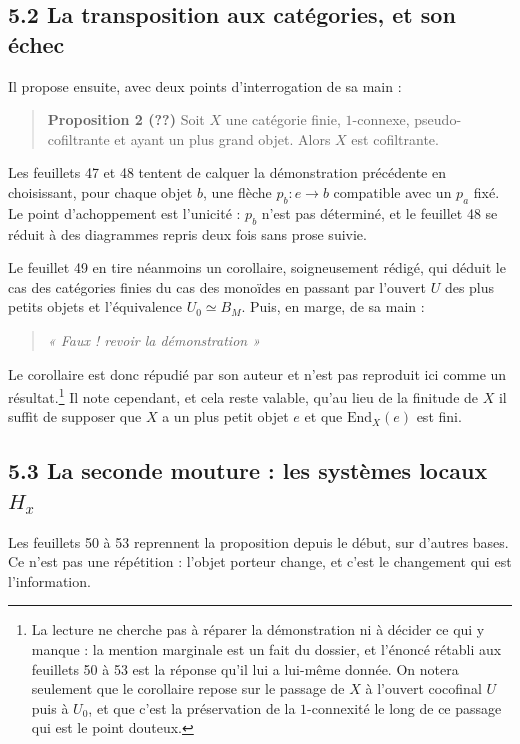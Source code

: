 \documentclass[11pt,a4paper]{article}
\begin{document}
\subsection*{5.2 La transposition aux catégories, et son échec}

Il propose ensuite, avec deux points d'interrogation de sa main :

\begin{quote}
\textbf{Proposition 2 (??)} Soit $X$ une catégorie finie, $1$-connexe,
pseudo-cofiltrante et ayant un plus grand objet. Alors $X$ est cofiltrante.
\end{quote}

Les feuillets 47 et 48 tentent de calquer la démonstration précédente en
choisissant, pour chaque objet $b$, une flèche $p_{b} : e \to b$ compatible
avec un $p_{a}$ fixé. Le point d'achoppement est l'unicité : $p_{b}$ n'est pas
déterminé, et le feuillet 48 se réduit à des diagrammes repris deux fois sans
prose suivie.

Le feuillet 49 en tire néanmoins un corollaire, soigneusement rédigé, qui
déduit le cas des catégories finies du cas des monoïdes en passant par
l'ouvert $U$ des plus petits objets et l'équivalence $U_{0} \simeq B_{M}$.
Puis, en marge, de sa main :

\begin{quote}
\emph{« Faux ! revoir la démonstration »}
\end{quote}

Le corollaire est donc répudié par son auteur et n'est pas reproduit ici comme
un résultat.\footnote{La lecture ne cherche pas à réparer la démonstration ni
à décider ce qui y manque : la mention marginale est un fait du dossier, et
l'énoncé rétabli aux feuillets 50 à 53 est la réponse qu'il lui a lui-même
donnée. On notera seulement que le corollaire repose sur le passage de $X$ à
l'ouvert cocofinal $U$ puis à $U_{0}$, et que c'est la préservation de la
$1$-connexité le long de ce passage qui est le point douteux.} Il note
cependant, et cela reste valable, qu'au lieu de la finitude de $X$ il suffit
de supposer que $X$ a un plus petit objet $e$ et que $\mathrm{End}_{X}(e)$ est
fini.

\subsection*{5.3 La seconde mouture : les systèmes locaux $H_{x}$}

Les feuillets 50 à 53 reprennent la proposition depuis le début, sur d'autres
bases. Ce n'est pas une répétition : l'objet porteur change, et c'est le
changement qui est l'information.
\end{document}
